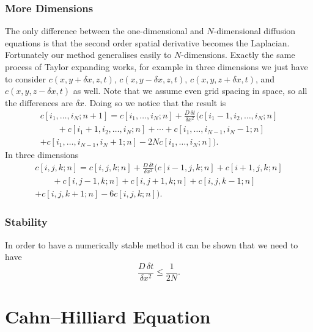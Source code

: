 \documentclass[fleqn]{NotesClass}
\begin{document}
    \subsection{More Dimensions}
    The only difference between the one-dimensional and \(N\)-dimensional diffusion equations is that the second order spatial derivative becomes the Laplacian.
    Fortunately our method generalises easily to \(N\)-dimensions.
    Exactly the same process of Taylor expanding works, for example in three dimensions we just have to consider \(c(x, y + \delta x, z, t)\), \(c(x, y - \delta x, z, t)\), \(c(x, y, z + \delta x, t)\), and \(c(x, y, z - \delta x, t)\) as well.
    Note that we assume even grid spacing in space, so all the differences are \(\delta x\).
    Doing so we notice that the result is
    \begin{multline}
        c[i_1, \dotsc, i_N; n + 1] = c[i_1, \dotsc, i_N; n] + \frac{D \, \delta t}{\delta x^2}(c[i_1 - 1, i_2, \dotsc, i_N; n]\\
        \qquad + c[i_1 + 1, i_2, \dotsc, i_N; n] + \dotsb + c[i_1, \dotsc, i_{N - 1}, i_N - 1; n]\\
        + c[i_1, \dotsc, i_{N- 1}, i_N + 1; n] - 2Nc[i_1, \dotsc, i_N; n]).
    \end{multline}
    In three dimensions
    \begin{multline}
        c[i, j, k; n] = c[i, j, k; n] + \frac{D \, \delta t}{\delta x^2} (c[i - 1, j, k; n] + c[i + 1, j, k; n]\\
        \qquad+ c[i, j - 1, k; n] + c[i, j + 1, k; n] + c[i, j, k - 1; n]\\
        + c[i, j, k + 1; n] - 6c[i, j, k; n]).
    \end{multline}
    
    \subsection{Stability}
    In order to have a numerically stable method it can be shown that we need to have
    \begin{equation}
        \frac{D \, \delta t}{\delta x^2} \le \frac{1}{2N}.
    \end{equation}
    
    \chapter{Cahn--Hilliard Equation}
\end{document}
